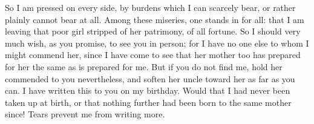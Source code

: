  So I am pressed on every side, by burdens which I can scarcely bear, or rather plainly cannot bear at all. Among these miseries, one stands in for all: that I am leaving that poor girl stripped of her patrimony, of all fortune. So I should very much wish, as you promise, to see you in person; for I have no one else to whom I might commend her, since I have come to see that her mother too has prepared for her the same as is prepared for me. But if you do not find me, hold her commended to you nevertheless, and soften her uncle toward her as far as you can. I have written this to you on my birthday. Would that I had never been taken up at birth, or that nothing further had been born to the same mother since! Tears prevent me from writing more.
